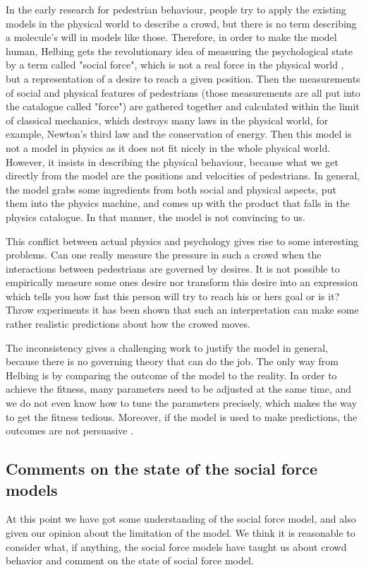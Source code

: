 In the early research for pedestrian behaviour, people try to apply the existing models in the physical world to describe a crowd, but there is no term describing 
a molecule's will in models like those. Therefore, in order to make the model human, Helbing gets the revolutionary idea of measuring the psychological state 
by a term called "social force", which is not a real force in the physical world \cite{social-force}, but a representation of a desire to reach a given position. Then the measurements of social and physical features of pedestrians (those measurements are all put into the catalogue called "force") are gathered together and calculated within the limit of classical mechanics, which destroys many laws in the physical world, for example, Newton's third law and the conservation of energy. Then this model is not a model in physics as it does not fit nicely in the whole physical world. However, it insists in describing the physical behaviour, because what we get directly from the model are the positions and velocities of pedestrians. In general, the model grabs some ingredients from both social and physical aspects, put them into the physics machine, and comes up with the product that falls in the physics catalogue. In that manner, the model is not convincing to us.

This conflict between actual physics and psychology gives rise to some interesting problems. Can one really measure the pressure in such a crowd when the interactions between pedestrians are governed by desires. It is not possible to empirically measure some ones desire nor transform this desire into an expression which tells you how fast this person will try to reach his or hers goal or is it?
Throw experiments it has been shown that such an interpretation can make some rather realistic predictions about how the crowed moves.

The inconsistency gives a challenging work to justify the model in general, because there is no governing theory that can do the job. The only way from Helbing 
is by comparing the outcome of the model to the reality. In order to achieve the fitness, many parameters need to be adjusted at the same time, and we do not even know how to tune the parameters precisely, which makes the way to get the fitness tedious. Moreover, if the model is used to make predictions, the
outcomes are not persuasive . 

\subsection{Comments on the state of the social force models}
At this point we have got some understanding of the social force model, and 
also given our opinion about the limitation of the model. We think it is 
reasonable to consider what, if anything, the social force models have taught 
us about crowd behavior and comment on the state of social force model. 

